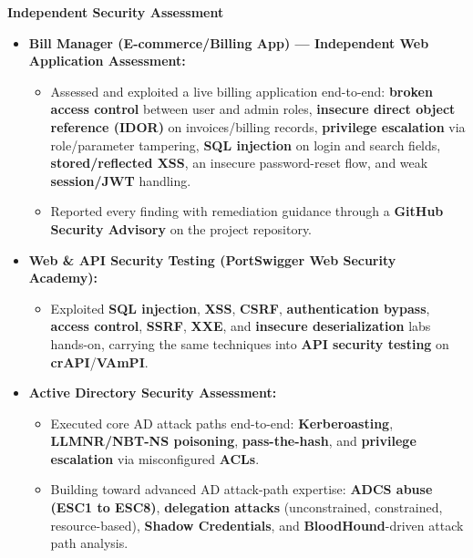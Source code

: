 \documentclass[9pt,a4paper]{extarticle}
\begin{document}
\vspace{3pt}
\noindent\textbf{Independent Security Assessment}
\begin{itemize}
  \item \textbf{Bill Manager (E-commerce/Billing App) — Independent Web Application Assessment:}
  \begin{itemize}
    \item Assessed and exploited a live billing application end-to-end: \textbf{broken access control}
          between user and admin roles, \textbf{insecure direct object reference (IDOR)} on
          invoices/billing records, \textbf{privilege escalation} via role/parameter tampering,
          \textbf{SQL injection} on login and search fields, \textbf{stored/reflected XSS}, an insecure
          password-reset flow, and weak \textbf{session/JWT} handling.
    \item Reported every finding with remediation guidance through a \textbf{GitHub Security Advisory}
          on the project repository.
  \end{itemize}

  \item \textbf{Web \& API Security Testing (PortSwigger Web Security Academy):}
  \begin{itemize}
    \item Exploited \textbf{SQL injection}, \textbf{XSS}, \textbf{CSRF}, \textbf{authentication bypass},
          \textbf{access control}, \textbf{SSRF}, \textbf{XXE}, and \textbf{insecure deserialization} labs
          hands-on, carrying the same techniques into \textbf{API security testing} on \textbf{crAPI}/\textbf{VAmPI}.
  \end{itemize}

  \item \textbf{Active Directory Security Assessment:}
  \begin{itemize}
    \item Executed core AD attack paths end-to-end: \textbf{Kerberoasting}, \textbf{LLMNR/NBT-NS
          poisoning}, \textbf{pass-the-hash}, and \textbf{privilege escalation} via misconfigured \textbf{ACLs}.
    \item Building toward advanced AD attack-path expertise: \textbf{ADCS abuse (ESC1 to ESC8)},
          \textbf{delegation attacks} (unconstrained, constrained, resource-based),
          \textbf{Shadow Credentials}, and \textbf{BloodHound}-driven attack path analysis.
  \end{itemize}
\end{itemize}
\end{document}
